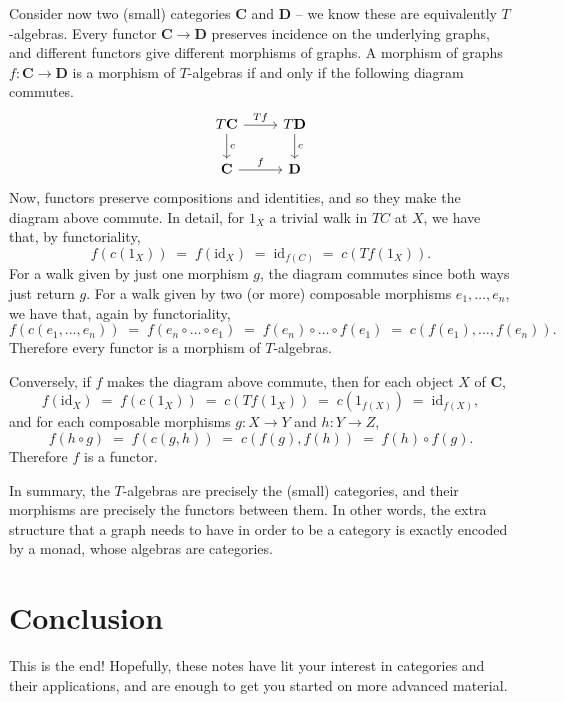 \documentclass[12pt,oneside]{scrbook}
\makeatletter
\newcommand*{\currentname}{\@currentlabelname}
\numberwithin{equation}{section}
\theoremstyle{plain}
\theoremstyle{definition}
\newcommand{\cat}[1]{{\mathbf{#1}}} %
\newcommand{\ar}[2][]{\arrow{#2}{#1}}
\DeclareMathOperator{\1}{\mathbbm{1}}
\DeclareMathOperator{\2}{\mathbbm{2}}
\newcommand{\id}{\mathrm{id}} %
\makeatother
\begin{document}
 Consider now two (small) categories $\cat{C}$ and $\cat{D}$ -- we know these are equivalently $T$-algebras. Every functor $\cat{C}\to\cat{D}$ preserves incidence on the underlying graphs, and different functors give different morphisms of graphs. A morphism of graphs $f:\cat{C}\to\cat{D}$ is a morphism of $T$-algebras if and only if the following diagram commutes.
 $$
 \begin{tikzcd}
  T\cat{C} \ar{d}{c} \ar{r}{Tf} & T\cat{D} \ar{d}{c} \\
  \cat{C} \ar{r}{f} & \cat{D}
 \end{tikzcd}
 $$
 Now, functors preserve compositions and identities, and so they make the diagram above commute. In detail, for $1_X$ a trivial walk in $TC$ at $X$, we have that, by functoriality,
 $$
 f(c(1_X)) \;=\; f(\id_X) \;=\; \id_{f(C)} \;=\; c(Tf(1_X)).
 $$
 For a walk given by just one morphism $g$, the diagram commutes since both ways just return $g$.
 For a walk given by two (or more) composable morphisms $e_1,\dots,e_n$, we have that, again by functoriality,
 $$
 f(c(e_1,\dots,e_n)) \;=\; f(e_n\circ\dots\circ e_1) \;=\;f(e_n)\circ\dots\circ f(e_1) \;=\; c(f(e_1),\dots,f(e_n)) .
 $$
 Therefore every functor is a morphism of $T$-algebras.
 
 Conversely, if $f$ makes the diagram above commute, then for each object $X$ of $\cat{C}$,
 $$
 f(\id_X) \;=\; f(c(1_X)) \;=\; c(Tf(1_X)) \;=\; c(1_{f(X)}) \;=\; \id_{f(X)} ,
 $$
 and for each composable morphisms $g:X\to Y$ and $h:Y\to Z$, 
 $$
 f(h\circ g) \;=\; f(c(g,h)) \;=\; c(f(g),f(h)) \;=\; f(h) \circ f(g) .
 $$
 Therefore $f$ is a functor. 
 
 In summary, the $T$-algebras are precisely the (small) categories, and their morphisms are precisely the functors between them. In other words, the extra structure that a graph needs to have in order to be a category is exactly encoded by a monad, whose algebras are categories.




\newpage
\chapter*{Conclusion}
\addcontentsline{toc}{chapter}{\currentname}


This is the end!  Hopefully, these notes have lit your interest in categories and their applications, and are enough to get you started on more advanced material. 
\end{document}
